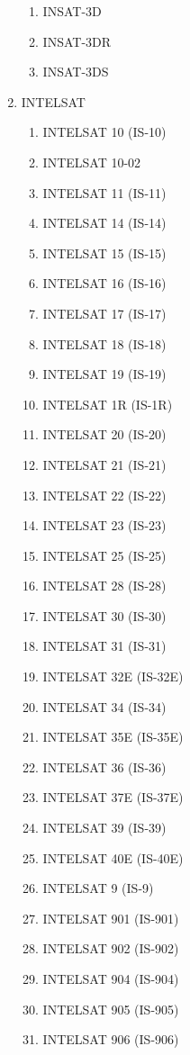 \begin{multicols}{2}
\begin{enumerate}
  \begin{enumerate}
    \item INSAT-3D
    \item INSAT-3DR
    \item INSAT-3DS
  \end{enumerate}
  \item INTELSAT
  \begin{enumerate}
    \item INTELSAT 10 (IS-10)
    \item INTELSAT 10-02
    \item INTELSAT 11 (IS-11)
    \item INTELSAT 14 (IS-14)
    \item INTELSAT 15 (IS-15)
    \item INTELSAT 16 (IS-16)
    \item INTELSAT 17 (IS-17)
    \item INTELSAT 18 (IS-18)
    \item INTELSAT 19 (IS-19)
    \item INTELSAT 1R (IS-1R)
    \item INTELSAT 20 (IS-20)
    \item INTELSAT 21 (IS-21)
    \item INTELSAT 22 (IS-22)
    \item INTELSAT 23 (IS-23)
    \item INTELSAT 25 (IS-25)
    \item INTELSAT 28 (IS-28)
    \item INTELSAT 30 (IS-30)
    \item INTELSAT 31 (IS-31)
    \item INTELSAT 32E (IS-32E)
    \item INTELSAT 34 (IS-34)
    \item INTELSAT 35E (IS-35E)
    \item INTELSAT 36 (IS-36)
    \item INTELSAT 37E (IS-37E)
    \item INTELSAT 39 (IS-39)
    \item INTELSAT 40E (IS-40E)
    \item INTELSAT 9 (IS-9)
    \item INTELSAT 901 (IS-901)
    \item INTELSAT 902 (IS-902)
    \item INTELSAT 904 (IS-904)
    \item INTELSAT 905 (IS-905)
    \item INTELSAT 906 (IS-906)
  \end{enumerate}

\end{enumerate}
\end{multicols}
